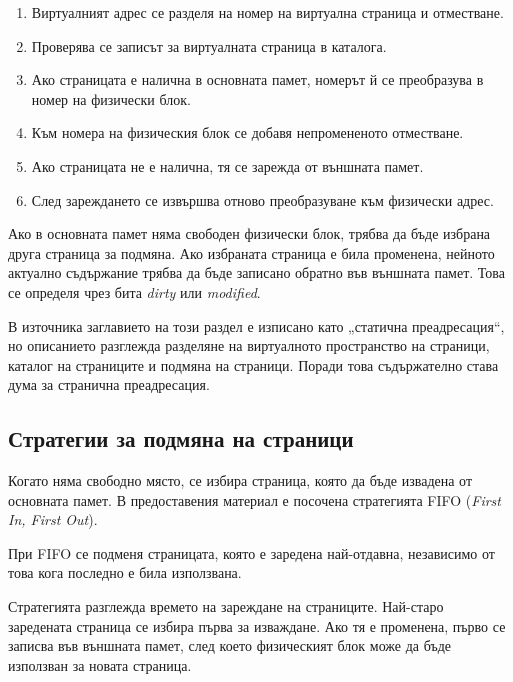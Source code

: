 \begin{enumerate}
    \item Виртуалният адрес се разделя на номер на виртуална страница и отместване.
    \item Проверява се записът за виртуалната страница в каталога.
    \item Ако страницата е налична в основната памет, номерът й се преобразува в номер на физически блок.
    \item Към номера на физическия блок се добавя непромененото отместване.
    \item Ако страницата не е налична, тя се зарежда от външната памет.
    \item След зареждането се извършва отново преобразуване към физически адрес.
\end{enumerate}

Ако в основната памет няма свободен физически блок, трябва да бъде избрана друга страница за подмяна. Ако избраната страница е била променена, нейното актуално съдържание трябва да бъде записано обратно във външната памет. Това се определя чрез бита \emph{dirty} или \emph{modified}.

\begin{supp}
В източника заглавието на този раздел е изписано като „статична преадресация“, но описанието разглежда разделяне на виртуалното пространство на страници, каталог на страниците и подмяна на страници. Поради това съдържателно става дума за странична преадресация.
\end{supp}

\subsection{Стратегии за подмяна на страници}\label{s:10.2.4}

Когато няма свободно място, се избира страница, която да бъде извадена от основната памет. В предоставения материал е посочена стратегията FIFO (\emph{First In, First Out}).

\begin{defn}
При FIFO се подменя страницата, която е заредена най-отдавна, независимо от това кога последно е била използвана.
\end{defn}

Стратегията разглежда времето на зареждане на страниците. Най-старо заредената страница се избира първа за изваждане. Ако тя е променена, първо се записва във външната памет, след което физическият блок може да бъде използван за новата страница.

